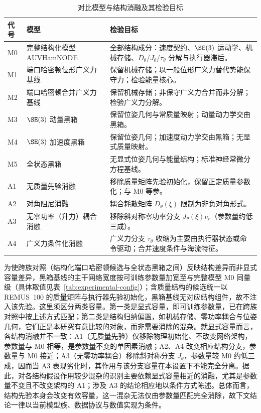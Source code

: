 \begin{table}[htbp]
  \centering
  \caption{对比模型与结构消融及其检验目标}
  \label{tab:model-comparison-roles}
  \begin{tabularx}{\textwidth}{l>{\raggedright\arraybackslash}p{}>{\raggedright\arraybackslash}X}
    \toprule
    代号 & 模型 & 检验目标 \\
    \midrule
    M0 & 完整结构化模型 AUVHamNODE & 全部结构成分：速度契约、\(\SE(3)\) 运动学、机械存储、\(D_\theta\)/\(J_\theta\)/\(\tau_\theta\) 分解与执行器滞后。 \\
    M1 & 端口哈密顿位形广义力基线 & 保留机械存储；以一般位形广义力替代势能保守力；检验能量核心。 \\
    M2 & 端口哈密顿合并广义力基线 & 保留机械存储；非保守广义力合并而非分解；检验广义力分解。 \\
    M3 & \(\SE(3)\) 动量黑箱 & 保留位姿几何与常质量映射；动量动力学交由黑箱。 \\
    M4 & \(\SE(3)\) 加速度黑箱 & 保留位姿几何；加速度动力学交由黑箱；无显式质量映射。 \\
    M5 & 全状态黑箱 & 无显式位姿几何与能量结构；标准神经常微分方程基线。 \\
    \midrule
    A1 & 无质量先验消融 & 移除质量矩阵先验初始化，保留正定质量参数化；与 M0 等参。 \\
    A2 & 对角阻尼消融 & 耦合耗散矩阵 \(D_\theta(\xi)\) 限制为非负对角形式。 \\
    A3 & 无零功率（升力）耦合消融 & 移除斜对称零功率分支 \(J_\theta(\xi)\nu_r\)（参数量约低三成）。 \\
    A4 & 广义力条件化消融 & 广义力分支 \(\tau_\theta\) 收缩为主要由执行器状态或命令驱动；合并速度条件与海流特征。 \\
    \bottomrule
  \end{tabularx}
\end{table}

为使跨族对照（结构化端口哈密顿候选与全状态黑箱之间）反映结构差异而非显式容量差异，黑箱基线的主干网络宽度按可训练参数量加宽至与完整模型 M0 同量级（具体取值见表~\ref{tab:experimental-config}）；含质量结构的候选统一以 REMUS~100 的质量矩阵与执行器先验初始化，黑箱基线无对应结构组件，故不注入该先验。这里须区分两类容量。第一类是显式容量，即可训练参数量，已在跨族对照中按上述方式匹配；第二类是结构归纳偏置，如机械存储、零功率耦合与位姿几何，它们正是本研究有意比较的对象，而非需要消除的混杂。就显式容量而言，各结构消融并不一致：A1（无质量先验）仅移除物理初始化、不改变网络架构，参数量与 M0 相等，是参数量不变的单因素消融；A2、A4 改变相应结构分支，参数量与 M0 接近；A3（无零功率耦合）移除斜对称分支 \(J_\theta\)，参数量较 M0 约低三成，因而当 A3 表现劣化时，其作用与该分支容量在本设置下不能完全分离。据此，对各结构假设作用较少混杂的识别主要依赖显式容量相近的消融，尤其是参数量不变且不改变架构的 A1；涉及 A3 的结论相应地以条件方式陈述。总体而言，结构先验本身会改变有效容量，这一混杂无法仅由参数量匹配完全消除，故下文结论一律以当前模型族、数据协议与数值实现为条件。

